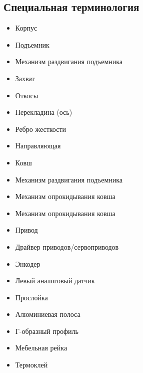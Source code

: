 \subsection{Специальная терминология}

\begin{itemize}
	\item Корпус
	\item Подъемник
	\item Механизм раздвигания подъемника
	\item Захват
	\item Откосы
	\item Перекладина (ось)
	\item Ребро жесткости
	\item Направляющая
	\item Ковш
	\item Механизм раздвигания подъемника
	\item Механизм опрокидывания ковша
	\item Механизм опрокидывания ковша
	\item Привод
	\item Драйвер приводов/сервоприводов
	\item Энкодер
	\item Левый аналоговый датчик
	\item Прослойка
	\item Алюминиевая полоса
	\item Г-образный профиль
	\item Мебельная рейка
	\item Термоклей
\end{itemize}

\fillpage 
\newpage
